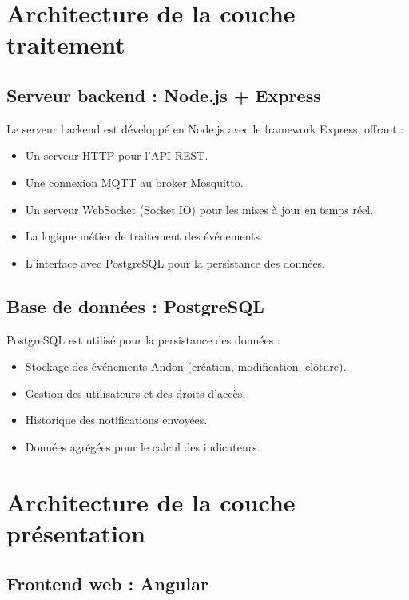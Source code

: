 \section{Architecture de la couche traitement}

\subsection{Serveur backend : Node.js + Express}

Le serveur backend est d\'evelopp\'e en Node.js avec le framework Express, offrant :

\begin{itemize}
    \item Un serveur HTTP pour l'API REST.
    \item Une connexion MQTT au broker Mosquitto.
    \item Un serveur WebSocket (Socket.IO) pour les mises \`a jour en temps r\'eel.
    \item La logique métier de traitement des \'ev\'enements.
    \item L'interface avec PostgreSQL pour la persistance des donn\'ees.
\end{itemize}


\subsection{Base de donn\'ees : PostgreSQL}

PostgreSQL est utilis\'e pour la persistance des donn\'ees :

\begin{itemize}
    \item Stockage des \'ev\'enements Andon (cr\'eation, modification, cl\^oture).
    \item Gestion des utilisateurs et des droits d'acc\`es.
    \item Historique des notifications envoy\'ees.
    \item Donn\'ees agr\'eg\'ees pour le calcul des indicateurs.
\end{itemize}

\section{Architecture de la couche pr\'esentation}

\subsection{Frontend web : Angular}

